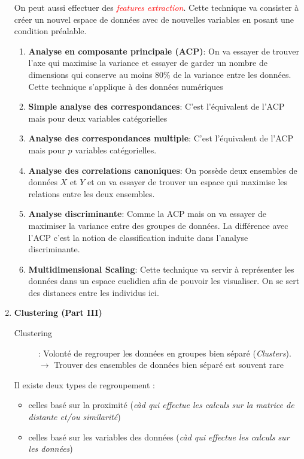 \documentclass[a4paper, 11pt, onecolumn]{article}
\begin{document}
\begin{enumerate}
On peut aussi effectuer des \textcolor{red}{\textit{features extraction}}. Cette technique va consister à créer un nouvel espace de données avec de nouvelles variables en posant une condition préalable.

\begin{enumerate}
\item \textbf{Analyse en composante principale (ACP)}: On va essayer de trouver l'axe qui maximise la variance et essayer de garder un nombre de dimensions qui conserve au moins 80\% de la variance entre les données. Cette technique s'applique à des données numériques

\item \textbf{Simple analyse des correspondances}: C'est l'équivalent de l'ACP mais pour deux variables catégorielles

\item \textbf{Analyse des correspondances multiple}: C'est l'équivalent de l'ACP mais pour $p$ variables catégorielles.

\item \textbf{Analyse des correlations canoniques}: On possède deux ensembles de données $X$ et $Y$ et on va essayer de trouver un espace qui maximise les relations entre les deux ensembles.

\item \textbf{Analyse discriminante}: Comme la ACP mais on va essayer de maximiser la variance entre des groupes de données. La différence avec l'ACP c'est la notion de classification induite dans l'analyse discriminante.

\item \textbf{Multidimensional Scaling}: Cette technique va servir à représenter les données dans un espace euclidien afin de pouvoir les visualiser. On se sert des distances entre les individus ici. 
\end{enumerate}

\item \textbf{Clustering (Part III)}

  \begin{description}
    \item[Clustering] : Volonté de regrouper les données en groupes bien séparé (\textit{Clusters}). $\rightarrow$ Trouver des ensembles de données bien séparé est souvent rare
  \end{description}

Il existe deux types de regroupement : 
\begin{itemize}
  \item celles basé sur la proximité (\textit{càd qui effectue
les calculs sur la matrice de distante et/ou similarité})
\item celles basé sur les variables des données (\textit{càd qui effectue les calculs sur les
  données})
  \end{itemize}


\end{enumerate}
\end{document}
